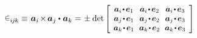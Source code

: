 \nopagebreak\vspace{-0.2em}
\begin{equation*}
\permutationsparitysymbols{i\hspace{-0.1ex}j\hspace{-0.1ex}k} \hspace{-0.1ex}
\equiv \hspace{.16ex} \bm{a}_i \hspace{-0.25ex} \times \hspace{-0.25ex} \bm{a}_j \dotp \hspace{.1ex} \bm{a}_k =
\hspace{.1ex} \pm \hspace{.1ex} \determinant\hspace{-0.1ex}
\scalebox{.92}{$\left[\hspace{-0.2ex}\begin{array}{c@{\hspace{.64em}}c@{\hspace{.64em}}c}
\bm{a}_i \narrowdotp\hspace{.12ex} \bm{e}_1 & \bm{a}_i \narrowdotp\hspace{.12ex} \bm{e}_2 & \bm{a}_i \narrowdotp\hspace{.12ex} \bm{e}_3 \\
\bm{a}_j \narrowdotp\hspace{.12ex} \bm{e}_1 & \bm{a}_j \narrowdotp\hspace{.12ex} \bm{e}_2 & \bm{a}_j \narrowdotp\hspace{.12ex} \bm{e}_3 \\
\bm{a}_k \narrowdotp\hspace{.12ex} \bm{e}_1 & \bm{a}_k \narrowdotp\hspace{.12ex} \bm{e}_2 & \bm{a}_k \narrowdotp\hspace{.12ex} \bm{e}_3
\end{array}\hspace{-0.12ex}\right]$}
\end{equation*}

\vspace{-0.2em}\noindent
{}

